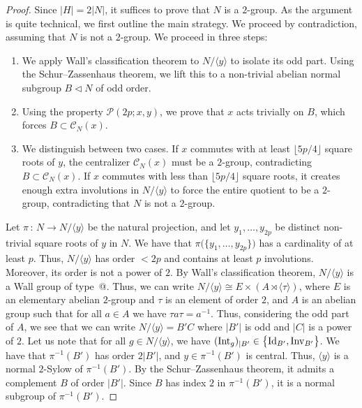 \documentclass[12pt]{amsart}
\makeatletter
\numberwithin{equation}{section}
\newcommand*{\rom}[1]{\expandafter\@slowromancap\romannumeral #1@}
\newcommand{\Id}{{\rm Id}}
\theoremstyle{definition}
\theoremstyle{remark}
\makeatother
\begin{document}
\begin{proof}
    Since $|H|=2|N|$, it suffices to prove that $N$ is a $2$-group. As the argument is quite technical, we first outline the main strategy. We proceed by contradiction, assuming that $N$ is not a $2$-group. We proceed in three steps:
    \begin{enumerate}
        \item We apply Wall's classification theorem to $N/\langle y\rangle$ to isolate its odd part. Using the Schur--Zassenhaus theorem, we lift this to a non-trivial abelian normal subgroup $B\lhd N$ of odd order.
        \item Using the property $\mathcal{P}(2p;x,y)$, we prove that $x$ acts trivially on $B$, which forces $B\subset \mathcal{C}_N(x)$.
        \item We distinguish between two cases. If $x$ commutes with at least $\lfloor 5p/4 \rfloor$ square roots of $y$, the centralizer $\mathcal{C}_N(x)$ must be a $2$-group, contradicting $B\subset \mathcal{C}_N(x)$. If $x$ commutes with less than $\lfloor 5p/4 \rfloor$ square roots, it creates enough extra involutions in $N/\langle y\rangle$ to force the entire quotient to be a $2$-group, contradicting that $N$ is not a $2$-group.
    \end{enumerate}
     Let $\pi\, \colon\, N\to N/\langle y\rangle$ be the natural projection, and let $y_1,\dots,y_{2p}$ be distinct non-trivial square roots of $y$ in $N$. We have that $\pi \bigl(\{y_1,\dots,y_{2p}\}\bigr)$ has a cardinality of at least $p$. Thus, $N/\langle  y\rangle$ has order $<2p$ and contains at least $p$ involutions. Moreover, its order is not a power of $2$. By Wall's classification theorem, $N/\langle y\rangle$ is a Wall group of type~\rom{1}. Thus, we can write $N/\langle y\rangle \cong E\times (A\rtimes\langle \tau \rangle)$, where $E$ is an elementary abelian $2$-group and $\tau $ is an element of order $2$, and $A$ is an abelian group such that for all $a\in A$ we have $\tau a \tau=a^{-1}$. Thus, considering the odd part of $A$, we see that we can write $N/\langle y\rangle=B' C$ where $|B'|$ is odd and $|C|$ is a power of $2$. Let us note that for all $g\in N/\langle y\rangle $, we have $(\mathrm{Int}_g)_{|B'}\in \bigl\{\Id_{B'},\mathrm{Inv}_{B'}\bigr\}$. We have that $\pi^{-1}(B')$ has order $2|B'|$, and $y\in \pi^{-1}(B')$ is central. Thus, $\langle y\rangle $ is a normal $2$-Sylow of $\pi^{-1}(B')$. By the Schur--Zassenhaus theorem, it admits a complement $B$ of order $|B'|$. Since $B$ has index $2$ in $\pi^{-1}(B')$, it is a normal subgroup of $\pi^{-1}(B')$.
    

\end{proof}
\end{document}

